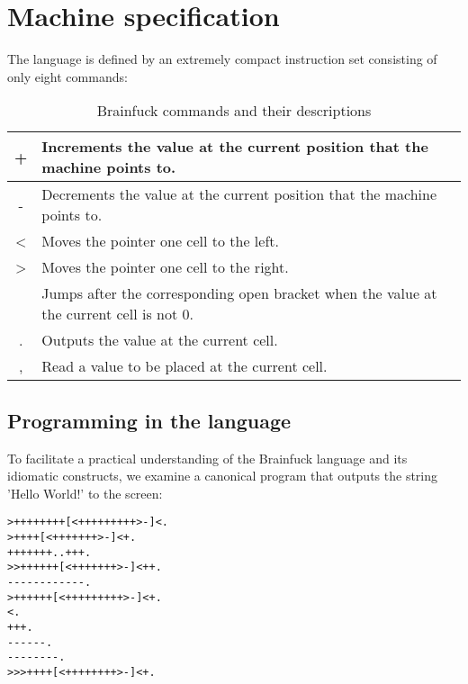\section{Machine specification}
\label{sec:ch2sec1}

\par The language is defined by an extremely compact instruction set consisting of only eight commands:

\begin{table}[H]
\centering
\begin{tabularx}{\textwidth}{| c | Y |}
\hline
+ & Increments the value at the current position that the machine points to. \\ \hline
- & Decrements the value at the current position that the machine points to. \\ \hline
\textless & Moves the pointer one cell to the left.                                  \\ \hline
\textgreater & Moves the pointer one cell to the right.                                 \\  & Jumps after the corresponding open bracket when the value at the current cell is not 0.   \\ \hline
. & Outputs the value at the current cell. \\ \hline
, & Read a value to be placed at the current cell. \\ \hline
\end{tabularx}
\caption{Brainfuck commands and their descriptions}
\end{table}

\subsection{Programming in the language}
\label{sec:ch2sec1sub1}

\par To facilitate a practical understanding of the Brainfuck language and its idiomatic constructs, we examine a canonical program that outputs the string 'Hello World!' to the screen:

\begin{verbatim}
>++++++++[<+++++++++>-]<.
>++++[<+++++++>-]<+.
+++++++..+++.
>>++++++[<+++++++>-]<++.
------------.
>++++++[<+++++++++>-]<+.
<.
+++.
------.
--------.
>>>++++[<++++++++>-]<+.
\end{verbatim}

